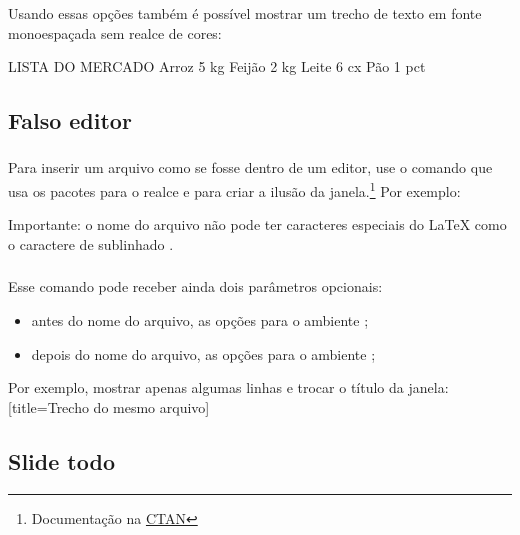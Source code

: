 \documentclass[aspectratio=169]{beamer}
\begin{document}
\begin{frame}[t,fragile]\frametitle{\secname}\framesubtitle{\subsecname}
  Usando essas opções também é possível mostrar um trecho de texto em fonte monoespaçada sem realce de cores:
\begin{snippet}[style=text]
LISTA DO MERCADO
Arroz       5 kg
Feijão      2 kg
Leite       6 cx
Pão         1 pct
\end{snippet}
\end{frame}

\subsection{Falso editor}

\begin{frame}[t]\frametitle{\secname}\framesubtitle{\subsecname}
  Para inserir um arquivo como se fosse dentro de um editor, use o comando  que usa os pacotes  para o realce e  para criar a ilusão da janela.\footnote[frame]{Documentação na \href{http://mirrors.ctan.org/macros/latex/contrib/tcolorbox/tcolorbox.pdf}{CTAN}} Por exemplo:

  Importante: o nome do arquivo não pode ter caracteres especiais do \LaTeX{}  como o caractere de sublinhado \inline*{\_}.
\end{frame}

\begin{frame}[t]\frametitle{\secname}\framesubtitle{\subsecname}
  Esse comando pode receber ainda dois parâmetros opcionais:
  \begin{itemize}
    \item antes do nome do arquivo, as opções para o ambiente ;
    \item depois do nome do arquivo, as opções para o ambiente ;
  \end{itemize}

  Por exemplo, mostrar apenas algumas linhas e trocar o título da janela:
[title={Trecho do mesmo arquivo}]
\end{frame}

\subsection{Slide todo}
\end{document}
